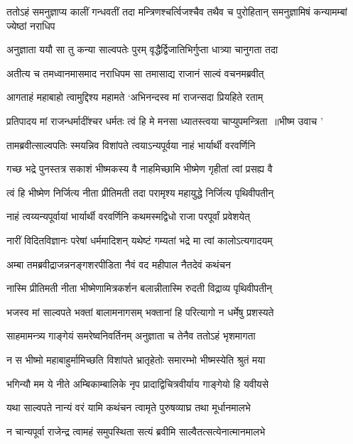 \threelineshloka
{ततोऽहं समनुज्ञाप्य कालीं गन्धवतीं तदा}
{मन्त्रिणश्चर्त्विजश्चैव तथैव च पुरोहितान्}
{समनुज्ञामिषं कन्यामम्बां ज्येष्ठां नराधिप}


\twolineshloka
{अनुज्ञाता ययौ सा तु कन्या साल्वपतेः पुरम्}
{वृद्धैर्द्विजातिभिर्गुप्ता धात्र्या चानुगता तदा}


\twolineshloka
{अतीत्य च तमध्वानमासमाद नराधिपम}
{सा तमासाद्य राजानं साल्वं वचनमब्रवीत्}


\twolineshloka
{आगताहं महाबाहो त्वामुद्दिश्य महामते}
{`अभिनन्दस्व मां राजन्सदा प्रियहिते रताम्}


\threelineshloka
{प्रतिपादय मां राजन्धर्मादींश्चर धर्मतः}
{त्वं हि मे मनसा ध्यातस्त्वया चाप्युपमन्त्रिता ॥भीष्म उवाच}
{'}


\twolineshloka
{तामब्रवीत्साल्वपतिः स्मयन्निव विशांपते}
{त्वयाऽन्यपूर्वया नाहं भार्यार्थी वरवर्णिनि}


\twolineshloka
{गच्छ भद्रे पुनस्तत्र सकाशं भीष्मकस्य वै}
{नाहमिच्छामि भीष्मेण गृहीतां त्वां प्रसह्य वै}


\twolineshloka
{त्वं हि भीष्मेण निर्जित्य नीता प्रीतिमती तदा}
{परामृश्य महायुद्धे निर्जित्य पृथिवीपतीन्}


\twolineshloka
{नाहं त्वय्यन्यपूर्वायां भार्यार्थी वरवर्णिनि}
{कथमस्मद्विधो राजा परपूर्वां प्रवेशयेत्}


\twolineshloka
{नारीं विदितविज्ञानः परेषां धर्ममादिशन्}
{यथेष्टं गम्यतां भद्रे मा त्वां कालोऽत्यगादयम्}


\twolineshloka
{अम्बा तमब्रवीद्राजन्ननङ्गशरपीडिता}
{नैवं वद महीपाल नैतदेवं कथंचन}


\twolineshloka
{नास्मि प्रीतिमती नीता भीष्मेणामित्रकर्शन}
{बलान्नीतास्मि रुदती विद्राव्य पृथिवीपतीन्}


\twolineshloka
{भजस्व मां साल्वपते भक्तां बालामनागसम्}
{भक्तानां हि परित्यागो न धर्मेषु प्रशस्यते}


\twolineshloka
{साहमामन्त्र्य गाङ्गेयं समरेष्वनिवर्तिनम्}
{अनुज्ञाता च तेनैव ततोऽहं भृशमागता}


\twolineshloka
{न स भीष्मो महाबाहुर्मामिच्छति विशांपते}
{भ्रातृहेतोः समारम्भो भीष्मस्येति श्रुतं मया}


\twolineshloka
{भगिन्यौ मम ये नीते अम्बिकाम्बालिके नृप}
{प्रादाद्विचित्रवीर्याय गाङ्गेयो हि यवीयसे}


\twolineshloka
{यथा साल्वपते नान्यं वरं यामि कथंचन}
{त्वामृते पुरुषव्याघ्र तथा मूर्धानमालभे}


\twolineshloka
{न चान्यपूर्वा राजेन्द्र त्वामहं समुपस्थिता}
{सत्यं ब्रवीमि साल्वैतत्सत्येनात्मानमालभे}


